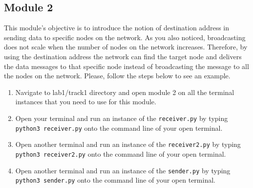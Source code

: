 \documentclass[11pt]{article}
\begin{document}

\subsection{Module 2}
\label{subsec:module2}
This module's objective is to introduce the notion of destination address in sending data to specific nodes on the network. As you also noticed, broadcasting does not scale when the number of nodes on the network increases. Therefore, by using the destination address the network can find the target node and delivers the data messages to that specific node instead of broadcasting the message to all the nodes on the network. Please, follow the steps below to see an example.


\begin{enumerate}
    \item Navigate to lab1/track1 directory and open module 2 on all the terminal instances that you need to use for this module.
    \item Open your terminal and run an instance of the \texttt{receiver.py} by typing \texttt{python3 receiver.py} onto the command line of your open terminal.
    \item Open another terminal and run an instance of the \texttt{receiver2.py} by typing \texttt{python3 receiver2.py} onto the command line of your open terminal.
    \item Open another terminal and run an instance of the \texttt{sender.py} by typing \texttt{python3 sender.py} onto the command line of your open terminal.
\end{enumerate}


\end{document}
